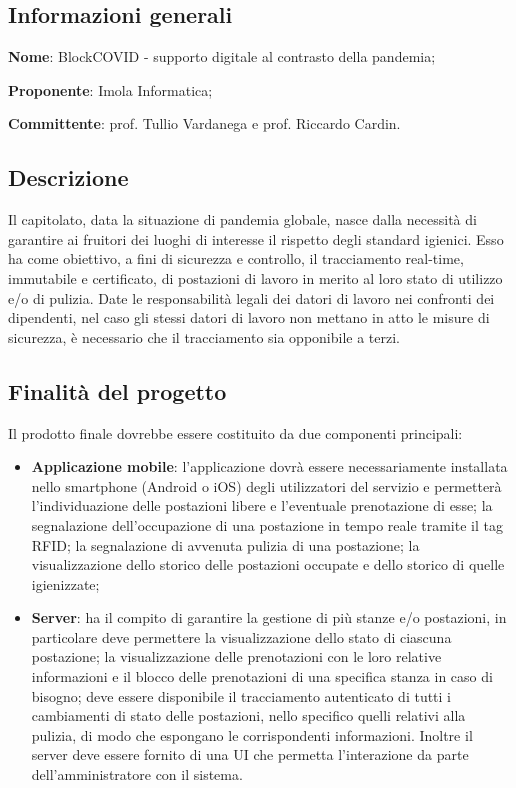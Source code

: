 \documentclass[../studio-di-fattibilita.tex]{subfiles}
\begin{document}
\subsection{Informazioni generali}%
\label{sub:informazioni_generale}
\begin{description}
  \item \textbf{Nome}: BlockCOVID - supporto digitale al contrasto della pandemia;
  \item \textbf{Proponente}: Imola Informatica;
  \item \textbf{Committente}: prof. Tullio Vardanega e prof. Riccardo Cardin.
\end{description}

\subsection{Descrizione}%
\label{sub:c1_descrizione}
Il capitolato, data la situazione di pandemia globale, nasce dalla necessità di garantire ai fruitori dei luoghi di interesse il rispetto degli standard igienici. Esso ha come obiettivo, a fini di sicurezza e controllo, il tracciamento real-time, immutabile e certificato, di postazioni di lavoro in merito al loro stato di utilizzo e/o di pulizia. Date le responsabilità legali dei datori di lavoro nei confronti dei dipendenti, nel caso gli stessi datori di lavoro non mettano in atto le misure di sicurezza, è necessario che il tracciamento sia opponibile a terzi.

\subsection{Finalità del progetto}%
\label{sub:c1_finalita_del_progetto}
Il prodotto finale dovrebbe essere costituito da due componenti principali: 
\begin{itemize}
  \item \textbf{Applicazione mobile}: l’applicazione dovrà essere necessariamente installata nello smartphone (Android o iOS) degli utilizzatori del servizio e permetterà l’individuazione delle postazioni libere e l’eventuale prenotazione di esse; la segnalazione dell’occupazione di una postazione in tempo reale tramite il tag RFID; la segnalazione di avvenuta pulizia di una postazione; la visualizzazione dello storico delle postazioni occupate e dello storico di quelle igienizzate;
  \item \textbf{Server}: ha il compito di garantire la gestione di più stanze e/o postazioni, in particolare deve permettere la visualizzazione dello stato di ciascuna postazione; la visualizzazione delle prenotazioni con le loro relative informazioni e il blocco delle prenotazioni di una specifica stanza in caso di bisogno; deve essere disponibile il tracciamento autenticato di tutti i cambiamenti di stato delle postazioni, nello specifico quelli relativi alla pulizia, di modo che espongano le corrispondenti informazioni. Inoltre il server deve essere fornito di una UI che permetta l’interazione da parte dell’amministratore con il sistema.
\end{itemize}
\end{document}
